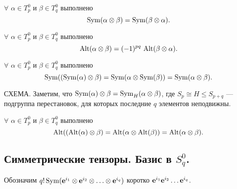 \begin{predl}\label{comm_sym}
$\forall$  $\alpha \in T^0_p$ и $\beta \in T^{0}_{q}$ выполнено
$$\mathop{\rm Sym}\nolimits (\alpha \otimes \beta)  = \mathop{\rm Sym}\nolimits (\beta \otimes \alpha ).$$
\end{predl}


\begin{predl}\label{comm_alt}
$\forall$  $\alpha \in T^0_p$ и $\beta \in T^{0}_{q}$ выполнено
$$\mathop{\rm Alt}\nolimits (\alpha \otimes \beta)  = (-1)^{pq} \, \mathop{\rm Alt}\nolimits (\beta \otimes \alpha ).$$
\end{predl}

\begin{predl}\label{double_mix_sym_1}
$\forall$  $\alpha \in T^0_p$ и $\beta \in T^{0}_{q}$ выполнено
$$\mathop{\rm Sym}\nolimits ((\mathop{\rm Sym}\nolimits (\alpha)  \otimes \beta)  =  \mathop{\rm Sym}\nolimits (\alpha \otimes \mathop{\rm Sym}\nolimits (\beta) ) = \mathop{\rm Sym}\nolimits (\alpha \otimes \beta).$$
\end{predl}
\dok СХЕМА. 
Заметим, что $\mathop{\rm Sym}\nolimits (\alpha)  \otimes \beta  = \mathop{\rm Sym}\nolimits_H  (\alpha  \otimes \beta)$, где $S_p\cong H \leq S_{p+q}$ ---  подгруппа перестановок, для которых последние $q$ элементов неподвижны.
\edok

\begin{predl}\label{double_mix_alt_1}
$\forall$  $\alpha \in T^0_p$ и $\beta \in T^{0}_{q}$ выполнено
$$\mathop{\rm Alt}\nolimits ((\mathop{\rm Alt}\nolimits (\alpha)  \otimes \beta)  =  \mathop{\rm Alt}\nolimits (\alpha \otimes \mathop{\rm Alt}\nolimits (\beta) ) = \mathop{\rm Alt}\nolimits (\alpha \otimes \beta).$$
\end{predl}

\subsection{Симметрические тензоры. Базис в $S^0_q$.}


Обозначим $q! \mathop{\rm Sym}\nolimits (\mathbf{e}^{i_1} \otimes \mathbf{e}^{i_2} \otimes \ldots \otimes \mathbf{e}^{i_q})$ 
коротко $\mathbf{e}^{i_1}\mathbf{e}^{i_2}\ldots \mathbf{e}^{i_q}$.


